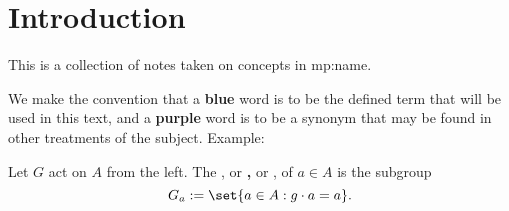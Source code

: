 \chapter*{Introduction}
This is a collection of notes taken on concepts in {mp:name}.

We make the convention that a \textbf{\textcolor{jd_blue}{blue}} word is
to be the defined term that will be used in this text, and a
\textbf{\textcolor{jd_purple}{purple}} word is to be a synonym that may be
found in other treatments of the subject. Example:
\begin{define*}
    Let $G$ act on $A$ from the left.
    The {\bfseries\color{jd_blue}{isotropy group}}, or
    {\bfseries\color{jd_blue}{stabilizer},} or
    {\bfseries\color{jd_purple}{little group}}, of $a \in A$ is the subgroup
    \[
        G_a := \set{a \in A : g \cdot a = a}.
    \]
\end{define*}
